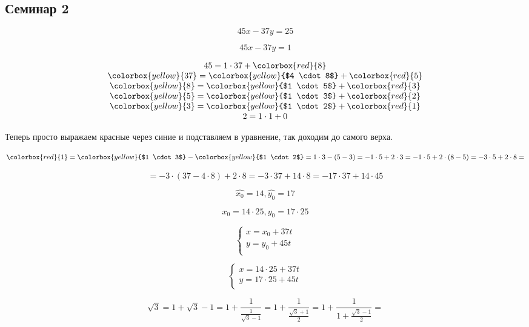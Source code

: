 \subsection*{Семинар 2}

$$45x - 37y = 25$$

$$45x - 37y = 1$$

$$
\begin{array}{c}
    45 = 1 \cdot 37 + \colorbox{red}{8}\\
    \colorbox{yellow}{37} = \colorbox{yellow}{$4 \cdot 8$} + \colorbox{red}{5}\\
    \colorbox{yellow}{8} = \colorbox{yellow}{$1 \cdot 5$} + \colorbox{red}{3}\\
    \colorbox{yellow}{5} = \colorbox{yellow}{$1 \cdot 3$} + \colorbox{red}{2}\\
    \colorbox{yellow}{3} = \colorbox{yellow}{$1 \cdot 2$} + \colorbox{red}{1}\\
    2 = 1 \cdot 1 + 0\\
\end{array}$$

Теперь просто выражаем красные через синие и подставляем в уравнение, так доходим до самого верха.

$$\colorbox{red}{1} = \colorbox{yellow}{$1 \cdot 3$} - \colorbox{yellow}{$1 \cdot 2$} = 1 \cdot 3 - (5 - 3) = -1 \cdot 5 + 2 \cdot 3 = -1 \cdot 5 + 2 \cdot (8 - 5) = -3 \cdot 5 + 2 \cdot 8 =$$

$$= -3 \cdot (37 - 4 \cdot 8) + 2 \cdot 8 = - 3 \cdot 37 + 14 \cdot 8 = -17 \cdot 37 + 14 \cdot 45$$

$$\hat{x_0} = 14, \hat{y_0} = 17$$

$$x_0 = 14 \cdot 25, y_0 = 17 \cdot 25$$

$$\begin{cases}
    x = x_0 + 37t\\
    y = y_0 + 45t\\
\end{cases}$$

$$\begin{cases}
    x = 14 \cdot 25 + 37t\\
    y = 17 \cdot 25 + 45t\\
\end{cases}$$



$$\sqrt{3} = 1 + \sqrt{3} - 1 = 1 + \frac{1}{\frac{1}{ \sqrt{3} - 1}} = 1 + \frac{1}{\frac{ \sqrt{3} + 1}{2}} = 1 + \frac{1}{1 + \frac{ \sqrt{3} - 1}{2}} =$$

